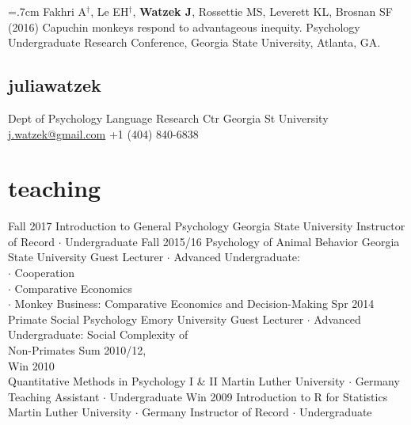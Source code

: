 \documentclass[]{friggeri-cv}
\begin{document}
\hangindent=.7cm Fakhri A${}^\dagger$, Le EH${}^\dagger$, \textbf{Watzek J}, Rossettie MS, Leverett KL, Brosnan SF (2016) Capuchin monkeys respond to advantageous inequity. Psychology Undergraduate Research Conference, Georgia State University, Atlanta, GA.\\[.5cm]


\begin{aside}
  \section{{\normalfont julia}watzek}
    Dept of Psychology
    Language Research Ctr
    Georgia St University
    ~
    \href{mailto:j.watzek@gmail.com}{j.watzek@gmail.com}
    +1 (404) 840-6838
\end{aside}



\section{teaching}

\begin{entrylist}
  \entry
    {Fall 2017}
    {Introduction to General Psychology}
    {Georgia State University}
    {Instructor of Record $\cdot$ Undergraduate}
  \entry
    {Fall 2015/16}
    {Psychology of Animal Behavior}
    {Georgia State University}
    {Guest Lecturer $\cdot$ Advanced Undergraduate:\\ 
    $\cdot$ Cooperation\\
    $\cdot$ Comparative Economics\\
    $\cdot$ Monkey Business: Comparative Economics and Decision-Making}
  \entry
    {Spr 2014}
    {Primate Social Psychology}
    {Emory University}
    {Guest Lecturer $\cdot$ Advanced Undergraduate: Social Complexity of\\ Non-Primates}
  \entry
    {Sum 2010/12,\\Win 2010\\[-.85cm]}
    {Quantitative Methods in Psychology I \& II}
    {Martin Luther University $\cdot$ Germany}
    {Teaching Assistant $\cdot$ Undergraduate}
  \entry
    {Win 2009}
    {Introduction to R for Statistics}
    {Martin Luther University $\cdot$ Germany}
    {Instructor of Record $\cdot$ Undergraduate}
\end{entrylist}
\end{document}

